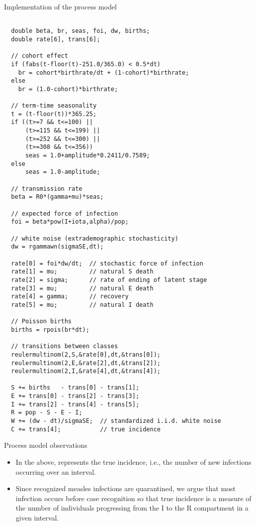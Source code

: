 \begin{frame}{Implementation of the process model}
\begin{lstlisting}[basicstyle=\ttfamily\scriptsize]

  double beta, br, seas, foi, dw, births;
  double rate[6], trans[6];
  
  // cohort effect
  if (fabs(t-floor(t)-251.0/365.0) < 0.5*dt)
    br = cohort*birthrate/dt + (1-cohort)*birthrate;
  else
    br = (1.0-cohort)*birthrate;

  // term-time seasonality
  t = (t-floor(t))*365.25;
  if ((t>=7 && t<=100) ||
      (t>=115 && t<=199) ||
      (t>=252 && t<=300) ||
      (t>=308 && t<=356))
      seas = 1.0+amplitude*0.2411/0.7589;
  else
      seas = 1.0-amplitude;

  // transmission rate
  beta = R0*(gamma+mu)*seas;

  // expected force of infection
  foi = beta*pow(I+iota,alpha)/pop;
  
  // white noise (extrademographic stochasticity)
  dw = rgammawn(sigmaSE,dt);
  
  rate[0] = foi*dw/dt;  // stochastic force of infection
  rate[1] = mu;         // natural S death
  rate[2] = sigma;      // rate of ending of latent stage
  rate[3] = mu;         // natural E death
  rate[4] = gamma;      // recovery
  rate[5] = mu;         // natural I death

  // Poisson births
  births = rpois(br*dt);
  
  // transitions between classes
  reulermultinom(2,S,&rate[0],dt,&trans[0]);
  reulermultinom(2,E,&rate[2],dt,&trans[2]);
  reulermultinom(2,I,&rate[4],dt,&trans[4]);

  S += births   - trans[0] - trans[1];
  E += trans[0] - trans[2] - trans[3];
  I += trans[2] - trans[4] - trans[5];
  R = pop - S - E - I;
  W += (dw - dt)/sigmaSE;  // standardized i.i.d. white noise
  C += trans[4];           // true incidence

\end{lstlisting}
\end{frame}

\begin{frame}[fragile]{Process model observations}
  \begin{itemize}
  \item In the above,  represents the true incidence, i.e., the number of new infections occurring over an interval.
  \item Since recognized measles infections are quarantined, we argue that most infection occurs before case recognition so that true incidence is a measure of the number of individuals progressing from the I to the R compartment in a given interval.
  \end{itemize}
\end{frame}


